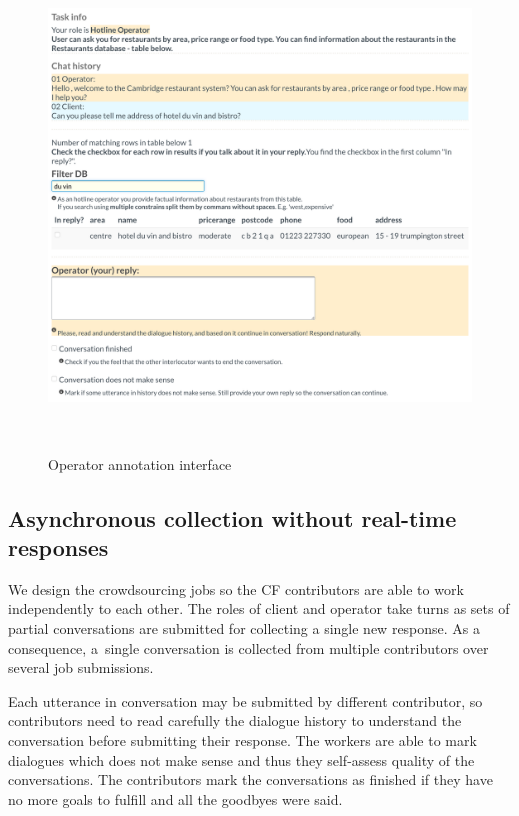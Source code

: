 \documentclass[runningheads,a4paper]{llncs}
\begin{document}
\begin{figure}
\vspace{-1.00em}
\begin{center}
\includegraphics[height=35em]{gui-annotators-system}
\caption{Operator annotation interface}
\end{center}
\vspace{-1.00em}
\label{fig:operator}
\end{figure}
\vspace{-1.00em}

\vspace{-1.00em}
\subsection{Asynchronous collection without real-time responses}
\label{sec:async}
We design the crowdsourcing jobs so the CF contributors are able to work independently to each other.
The roles of client and operator take turns as sets of partial conversations are submitted for collecting a single new response.
As a consequence, a~single conversation is collected from multiple contributors over several job submissions.

Each utterance in conversation may be submitted by different contributor, so contributors need to read carefully the dialogue history to understand the conversation before submitting their response.
The workers are able to mark dialogues which does not make sense and thus they self-assess quality of the conversations.
The contributors mark the conversations as finished if they have no more goals to fulfill and all the goodbyes were said.
\end{document}

